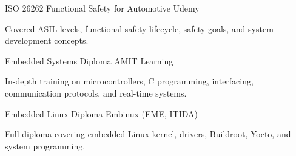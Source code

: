 

\begin{cventries}

  \cventry
    {ISO 26262 Functional Safety for Automotive} %
    {Udemy} %
    {} %
    {} %
    {
      \begin{cvitems} %
        \item {Covered ASIL levels, functional safety lifecycle, safety goals, and system development concepts.}
      \end{cvitems}
    }

  \cventry
    {Embedded Systems Diploma} %
    {AMIT Learning} %
    {} %
    {} %
    {
      \begin{cvitems} %
        \item {In-depth training on microcontrollers, C programming, interfacing, communication protocols, and real-time systems.}
      \end{cvitems}
    }

  \cventry
    {Embedded Linux Diploma} %
    {Embinux (EME, ITIDA)} %
    {} %
    {} %
    {
      \begin{cvitems} %
        \item {Full diploma covering embedded Linux kernel, drivers, Buildroot, Yocto, and system programming.}
      \end{cvitems}
    }

\end{cventries}